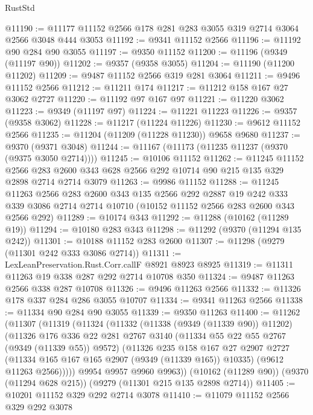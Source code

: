 \begin{lexlean}{RustStd}
\begin{coremodule}
@11190 := @11177 @11152 @2566 @178 @281 @283 @3055 @319 @2714 @3064 @2566 @3048 @444 @3053
@11192 := @9341 @11152 @2566
@11196 := @11192 @90 @284 @90 @3055
@11197 := @9350 @11152
@11200 := @11196 (@9349 (@11197 @90))
@11202 := @9357 (@9358 @3055)
@11204 := @11190 (@11200 @11202)
@11209 := @9487 @11152 @2566 @319 @281 @3064
@11211 := @9496 @11152 @2566
@11212 := @11211 @174
@11217 := @11212 @158 @167 @27 @3062 @2727
@11220 := @11192 @97 @167 @97
@11221 := @11220 @3062
@11223 := @9349 (@11197 @97)
@11224 := @11221 @11223
@11226 := @9357 (@9358 @3062)
@11228 := @11217 (@11224 @11226)
@11230 := @9612 @11152 @2566
@11235 := @11204 (@11209 (@11228 @11230)) @9658 @9680
@11237 := @9370 (@9371 @3048)
@11244 := @11167 (@11173 (@11235 @11237 (@9370 (@9375 @3050 @2714))))
@11245 := @10106 @11152
@11262 := @11245
    @11152
    @2566
    @283
    @2600
    @343
    @628
    @2566
    @292
    @10714
    @90
    @215
    @135
    @329
    @2898
    @2714
    @2714
    @3079
@11263 := @9986 @11152
@11288 := @11245
    @11263
    @2566
    @283
    @2600
    @343
    @135
    @2566
    @292
    @2887
    @19
    @242
    @333
    @339
    @3086
    @2714
    @2714
    @10710
    (@10152 @11152 @2566 @283 @2600 @343 @2566 @292)
@11289 := @10174 @343
@11292 := @11288 (@10162 (@11289 @19))
@11294 := @10180 @283 @343
@11298 := @11292 (@9370 (@11294 @135 @242))
@11301 := @10188 @11152 @283 @2600
@11307 := @11298 (@9279 (@11301 @242 @333 @3086 @2714))
@11311 := LexLeanPreservation.Rust.Corr.callF @8921 @8923 @8925
@11319 := @11311 @11263 @19 @338 @287 @292 @2714 @10708 @350
@11324 := @9487 @11263 @2566 @338 @287 @10708
@11326 := @9496 @11263 @2566
@11332 := @11326 @178 @337 @284 @286 @3055 @10707
@11334 := @9341 @11263 @2566
@11338 := @11334 @90 @284 @90 @3055
@11339 := @9350 @11263
@11400 := @11262
    (@11307
      (@11319
        (@11324
          (@11332
            (@11338 (@9349 (@11339 @90)) @11202)
            (@11326
              @176
              @336
              @22
              @281
              @2767
              @3140
              (@11334 @55 @22 @55 @2767 (@9349 (@11339 @55)) @9572)
              (@11326
                @235
                @158
                @167
                @27
                @2907
                @2727
                (@11334 @165 @167 @165 @2907 (@9349 (@11339 @165)) @10335)
                (@9612 @11263 @2566)))))
        @9954
        @9957
        @9960
        @9963))
    (@10162 (@11289 @90))
    (@9370 (@11294 @628 @215))
    (@9279 (@11301 @215 @135 @2898 @2714))
@11405 := @10201 @11152 @329 @292 @2714 @3078
@11410 := @11079 @11152 @2566 @329 @292 @3078

\end{coremodule}
\end{lexlean}
